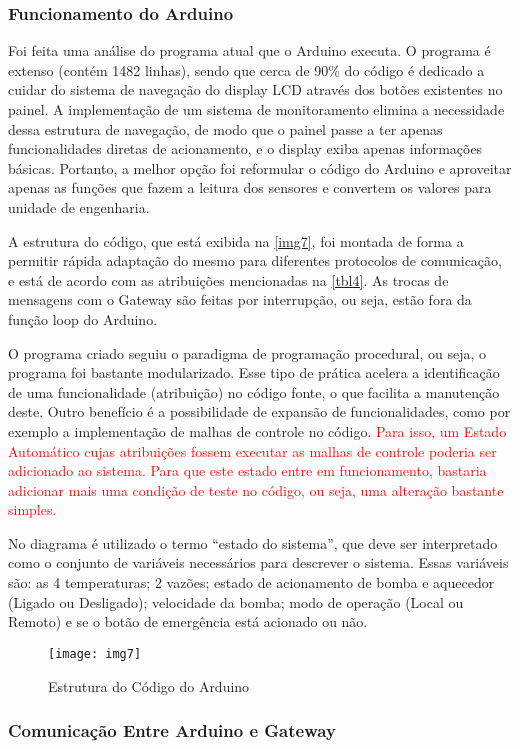 			
			\subsubsection{Funcionamento do Arduino}
			
				Foi feita uma análise do programa atual que o Arduino executa. O programa é extenso (contém 1482 linhas), sendo que cerca de 90\% do código é dedicado a cuidar do sistema de navegação do display LCD através dos botões existentes no painel.  A implementação de um sistema de monitoramento elimina a necessidade dessa estrutura de navegação, de modo que o painel passe a ter apenas funcionalidades diretas de acionamento, e o display exiba apenas informações básicas. Portanto, a melhor opção foi reformular o código do Arduino e aproveitar apenas as funções que fazem a leitura dos sensores e convertem os valores para unidade de engenharia.
				
				A estrutura do código, que está exibida na \autoref{img7}, foi montada de forma a permitir rápida adaptação do mesmo para diferentes protocolos de comunicação, e está de acordo com as atribuições mencionadas na \autoref{tbl4}. As trocas de mensagens com o Gateway são feitas por interrupção, ou seja, estão fora da função loop do Arduino. 
				
				O programa criado seguiu o paradigma de programação procedural, ou seja, o programa foi bastante modularizado. Esse tipo de prática acelera a identificação de uma funcionalidade (atribuição) no código fonte, o que facilita a manutenção deste. Outro benefício é a possibilidade de expansão de funcionalidades, como por exemplo a implementação de malhas de controle no código. \textcolor{red}{ Para isso, um Estado Automático cujas atribuições fossem executar as malhas de controle poderia ser adicionado ao sistema. Para que este estado entre em funcionamento, bastaria adicionar mais uma condição de teste no código, ou seja, uma alteração bastante simples.}
				
				No diagrama é utilizado o termo ``estado do sistema'', que deve ser interpretado como o conjunto de variáveis necessários para descrever o sistema. Essas variáveis são: as 4 temperaturas; 2 vazões; estado de acionamento de bomba e aquecedor (Ligado ou Desligado); velocidade da bomba; modo de operação (Local ou Remoto) e se o botão de emergência está acionado ou não.
			
				\begin{figure}[!htb]	
					\captionsetup{justification=centering}
					\begin{center}
						\texttt{[image: img7]}  %
						\caption[Estrutura do Código do Arduino]{\label{img7} Estrutura do Código do Arduino }
					\end{center}		
				\end{figure}
			
			\subsubsection{Comunicação Entre Arduino e Gateway}
				